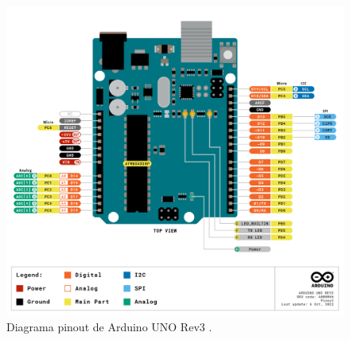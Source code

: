 \begin{figure}[H]
\centering
\includegraphics[scale=0.6]{./images/aaa.png} 
\caption{Diagrama pinout de Arduino UNO Rev3 \cite{arduino}.}
\label{f1}
\end{figure}